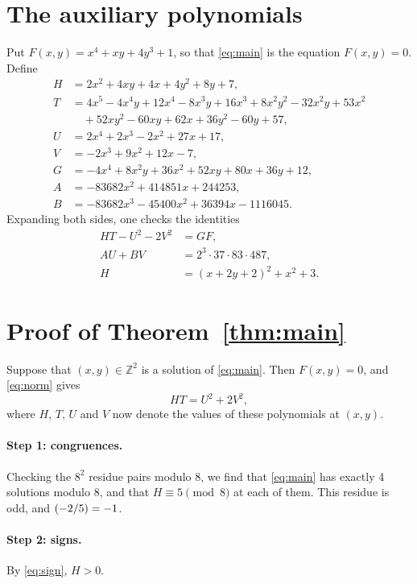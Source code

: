 \documentclass[11pt]{article}
\newcommand{\Z}{\mathbb{Z}}
\newcommand{\leg}[2]{\mathchoice{\biggl(\dfrac{#1}{#2}\biggr)}{(#1/#2)}{(#1/#2)}{(#1/#2)}}
\begin{document}
\section{The auxiliary polynomials}

Put $F(x,y)=x^{4}+xy+4y^{3}+1$, so that \eqref{eq:main} is the equation $F(x,y)=0$. Define
\begin{align*}
H&=2x^{2}+4xy+4x+4y^{2}+8y+7,\\
T&=4x^{5}-4x^{4}y+12x^{4}-8x^{3}y+16x^{3}+8x^{2}y^{2}-32x^{2}y+53x^{2}\\
&\quad+52xy^{2}-60xy+62x+36y^{2}-60y+57,\\
U&=2x^{4}+2x^{3}-2x^{2}+27x+17,\\
V&=-2x^{3}+9x^{2}+12x-7,\\
G&=-4x^{4}+8x^{2}y+36x^{2}+52xy+80x+36y+12,\\
A&=-83682x^{2}+414851x+244253,\\
B&=-83682x^{3}-45400x^{2}+36394x-1116045.
\end{align*}
Expanding both sides, one checks the identities
\begin{align}
HT-U^2-2V^2&=GF,\label{eq:norm}\\
AU+BV&=2^{3}\cdot 37\cdot 83\cdot 487,\label{eq:bezout}\\
H&=(x+2y+2)^2+x^2+3.\label{eq:sign}
\end{align}

\section{Proof of Theorem~\ref{thm:main}}

Suppose that $(x,y)\in\Z^2$ is a solution of \eqref{eq:main}. Then $F(x,y)=0$, and \eqref{eq:norm} gives
\begin{equation}\label{eq:HT}
HT=U^2+2V^2,
\end{equation}
where $H$, $T$, $U$ and $V$ now denote the values of these polynomials at $(x,y)$.

\paragraph{Step 1: congruences.} Checking the $8^2$ residue pairs modulo $8$, we find that \eqref{eq:main} has exactly 4 solutions modulo $8$, and that $H\equiv5\pmod{8}$ at each of them. This residue is odd, and $\leg{-2}{5}=-1$.

\paragraph{Step 2: signs.} By \eqref{eq:sign}, $H>0$.
\end{document}
